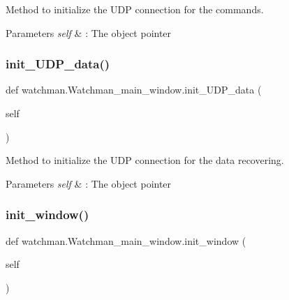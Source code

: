 Method to initialize the U\+DP connection for the commands. 


\begin{DoxyParams}{Parameters}
{\em self} & \+: The object pointer \\
\hline
\end{DoxyParams}
\mbox{\label{classwatchman_1_1_watchman__main__window_a116e7145b9e06726e1c5318fd8719697}} 
\subsubsection{\texorpdfstring{init\_UDP\_data()}{init\_UDP\_data()}}
{\footnotesize\ttfamily def watchman.\+Watchman\+\_\+main\+\_\+window.\+init\+\_\+\+U\+D\+P\+\_\+data (\begin{DoxyParamCaption}\item[{}]{self }\end{DoxyParamCaption})}



Method to initialize the U\+DP connection for the data recovering. 


\begin{DoxyParams}{Parameters}
{\em self} & \+: The object pointer \\
\hline
\end{DoxyParams}
\mbox{\label{classwatchman_1_1_watchman__main__window_a9b2df908b2feab8ac290197298cc4a7e}} 
\subsubsection{\texorpdfstring{init\_window()}{init\_window()}}
{\footnotesize\ttfamily def watchman.\+Watchman\+\_\+main\+\_\+window.\+init\+\_\+window (\begin{DoxyParamCaption}\item[{}]{self }\end{DoxyParamCaption})}



